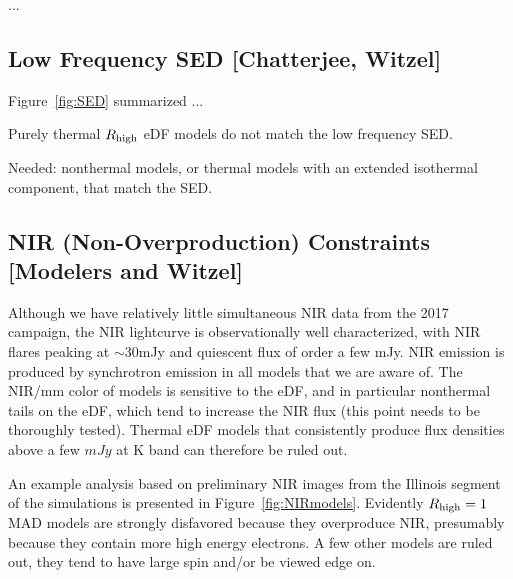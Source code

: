 \documentclass[twocolumn,tighten,dvipsnames]{aastex63}
\begin{document}
...

\subsection{Low Frequency SED
  [Chatterjee, Witzel]}
\label{sec:lfconst}

\begin{figure*}
  \caption{SED from historical observation and models.}
  \label{fig:SED}
\end{figure*}

Figure~\ref{fig:SED} summarized ...

Purely thermal ${R_\mathrm{high}}$ eDF models do not match the low frequency SED.

Needed: nonthermal models, or thermal models with an extended isothermal component, that match the SED.

\subsection{NIR (Non-Overproduction) Constraints
  [Modelers and Witzel]}
\label{sec:nirconst}

Although we have relatively little simultaneous NIR data from the 2017 campaign, the NIR lightcurve is observationally well characterized, with NIR flares peaking at $\sim 30$mJy and quiescent flux of order a few mJy.  NIR emission is produced by synchrotron emission in all models that we are aware of.  The NIR/mm color of models is sensitive to the eDF, and in particular nonthermal tails on the eDF, which tend to increase the NIR flux (this point needs to be thoroughly tested).  Thermal eDF models that consistently produce flux densities above a few $mJy$ at K band can therefore be ruled out.

An example analysis based on preliminary NIR images from the Illinois segment of the simulations is presented in Figure~\ref{fig:NIRmodels}.  Evidently ${R_\mathrm{high}} = 1$ MAD models are strongly disfavored because they overproduce NIR, presumably because they contain more high energy electrons.  A few other models are ruled out, they tend to have large spin and/or be viewed edge on.

\begin{figure*}
  \caption{Left: MAD models, Right: SANE models.  Models marked with a red dot consistently overproduce NIR emission, green dots indicate models that do not overproduce NIR.  The inclination is indicated by the position of the dot, with face-on models near twelve o'clock and edge-on models near three o'clock.}
  \label{fig:NIRmodels}
\end{figure*}
\end{document}
